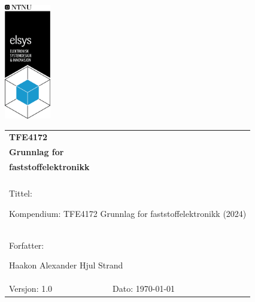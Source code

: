 \begin{minipage}[c]{0.15\textwidth}
\includegraphics[width=2.0cm]{Bilder/elsys_pos_staaende_ntnu.png}  
\end{minipage}
\begin{minipage}[c]{0.85\textwidth}

\renewcommand{\arraystretch}{1.7}
\large 
\begin{tabularx}{\textwidth}{|X|X|}
\hline
\multicolumn{2}{|l|}{\huge \textbf{TFE4172}} \\
\multicolumn{2}{|l|}{\huge \textbf{Grunnlag for}} \\
\multicolumn{2}{|l|}{\huge \textbf{faststoffelektronikk}} \\
\multicolumn{2}{|l|}{}  \\
\hline
\multicolumn{2}{|l|}{Tittel: 

Kompendium: TFE4172 Grunnlag for faststoffelektronikk (2024)
} \\
\hline
\multicolumn{2}{|l|}{Forfatter: 

Haakon Alexander Hjul Strand
} \\
\hline

Versjon: 1.0 & Dato: \today
\\
\hline 
\end{tabularx}
\end{minipage}
\normalsize